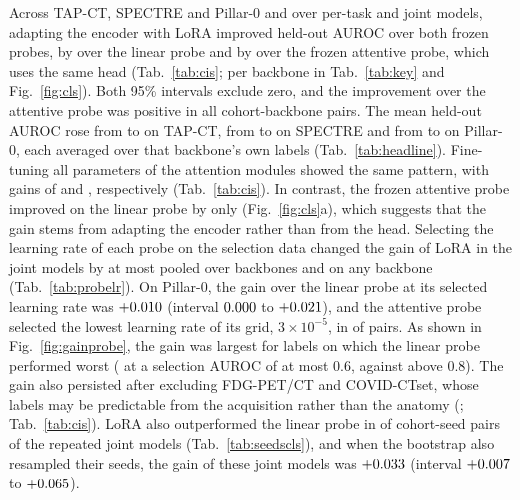 Across TAP-CT, SPECTRE and Pillar-0 and over per-task and joint models, adapting the encoder with LoRA improved held-out AUROC over both frozen probes, by \magn{\numCiClsloralinAllMeandiff} over the linear probe and by \magn{\numCiClsloraattnAllMeandiff} over the frozen attentive probe, which uses the same head (Tab.~\ref{tab:cis}; per backbone in Tab.~\ref{tab:key} and Fig.~\ref{fig:cls}). Both 95\% intervals exclude zero, and the improvement over the attentive probe was positive in all \numCiClsloraattnAllClustersN{} cohort-backbone pairs. The mean held-out AUROC rose from \pooledtapctlin{} to \pooledtapctlora{} on TAP-CT, from \pooledspectrelin{} to \pooledspectrelora{} on SPECTRE and from \pooledpillarZlin{} to \pooledpillarZlora{} on Pillar-0, each averaged over that backbone's own labels (Tab.~\ref{tab:headline}). Fine-tuning all parameters of the attention modules showed the same pattern, with gains of \magn{\numCiClsattnftlinAllMeandiff} and \magn{\numCiClsattnftattnAllMeandiff}, respectively (Tab.~\ref{tab:cis}). In contrast, the frozen attentive probe improved on the linear probe by only \magn{\numCiClsattnlinAllMeandiff} (Fig.~\ref{fig:cls}a), which suggests that the gain stems from adapting the encoder rather than from the head. Selecting the learning rate of each probe on the selection data changed the gain of LoRA in the joint models by at most \numProbelrMaxchange{} pooled over backbones and \numProbelrMaxchangeBb{} on any backbone (Tab.~\ref{tab:probelr}). On Pillar-0, the gain over the linear probe at its selected learning rate was $+0.010$ (interval $0.000$ to $+0.021$), and the attentive probe selected the lowest learning rate of its grid, $3\times10^{-5}$, in \numProbelrAttnLowN{} of \numProbelrPairsN{} pairs. As shown in Fig.~\ref{fig:gainprobe}, the gain was largest for labels on which the linear probe performed worst (\magn{\numGainbinLowMeandiff} at a selection AUROC of at most 0.6, against \magn{\numGainbinTopMeandiff} above 0.8). The gain also persisted after excluding FDG-PET/CT and COVID-CTset, whose labels may be predictable from the acquisition rather than the anatomy (\magn{\numCiClsloralinnoscAllMeandiff}; Tab.~\ref{tab:cis}). LoRA also outperformed the linear probe in \numSeedsclsLoraLinAllPosN{} of \numSeedsclsLoraLinAllPairsN{} cohort-seed pairs of the repeated joint models (Tab.~\ref{tab:seedscls}), and when the bootstrap also resampled their seeds, the gain of these joint models was $+0.033$ (interval $+0.007$ to $+0.065$).

